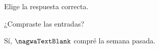
\begin{question}

\begin{instance}
  
\begin{mcq}[standalone=false]
    
\begin{stem}
      Elige la respuesta correcta.\par      
\begin{enumerationnolabel}
        \item{         ¿Compraste las entradas?        }        
        \item{          Sí, $\nagwaTextBlank$ compré la semana pasada.        }      
\end{enumerationnolabel}
    
\end{stem}
    
\begin{distractors}
\end{distractors}
              
\end{mcq}

\end{instance}

\end{question}
